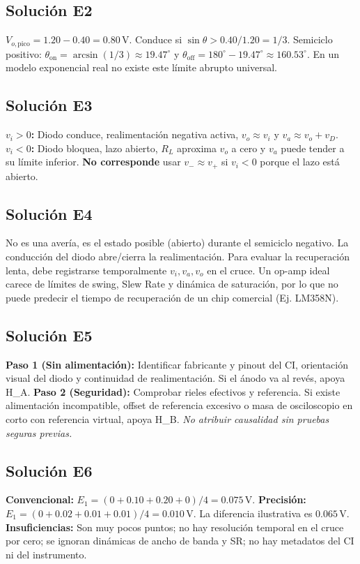 \documentclass[10pt, a4paper]{article}
\begin{document}
\subsection*{Solución E2}
$V_{o,\mathrm{pico}} = 1.20 - 0.40 = 0.80\,\text{V}$. Conduce si $\sin\theta > 0.40/1.20 = 1/3$. Semiciclo positivo: $\theta_{\mathrm{on}} = \arcsin(1/3) \approx 19.47^\circ$ y $\theta_{\mathrm{off}} = 180^\circ - 19.47^\circ \approx 160.53^\circ$. En un modelo exponencial real no existe este límite abrupto universal.

\subsection*{Solución E3}
\textbf{$v_i > 0$:} Diodo conduce, realimentación negativa activa, $v_o \approx v_i$ y $v_a \approx v_o + v_D$. \textbf{$v_i < 0$:} Diodo bloquea, lazo abierto, $R_L$ aproxima $v_o$ a cero y $v_a$ puede tender a su límite inferior. \textbf{No corresponde} usar $v_- \approx v_+$ si $v_i < 0$ porque el lazo está abierto.

\subsection*{Solución E4}
No es una avería, es el estado posible (abierto) durante el semiciclo negativo. La conducción del diodo abre/cierra la realimentación. Para evaluar la recuperación lenta, debe registrarse temporalmente $v_i, v_a, v_o$ en el cruce. Un op-amp ideal carece de límites de swing, Slew Rate y dinámica de saturación, por lo que no puede predecir el tiempo de recuperación de un chip comercial (Ej. LM358N).

\subsection*{Solución E5}
\textbf{Paso 1 (Sin alimentación):} Identificar fabricante y pinout del CI, orientación visual del diodo y continuidad de realimentación. Si el ánodo va al revés, apoya H\_A. \textbf{Paso 2 (Seguridad):} Comprobar rieles efectivos y referencia. Si existe alimentación incompatible, offset de referencia excesivo o masa de osciloscopio en corto con referencia virtual, apoya H\_B. \textit{No atribuir causalidad sin pruebas seguras previas.}

\subsection*{Solución E6}
\textbf{Convencional:} $E_1 = (0 + 0.10 + 0.20 + 0) / 4 = 0.075\,\text{V}$. \textbf{Precisión:} $E_1 = (0 + 0.02 + 0.01 + 0.01) / 4 = 0.010\,\text{V}$. La diferencia ilustrativa es $0.065\,\text{V}$. \\
\textbf{Insuficiencias:} Son muy pocos puntos; no hay resolución temporal en el cruce por cero; se ignoran dinámicas de ancho de banda y SR; no hay metadatos del CI ni del instrumento.
\end{document}

